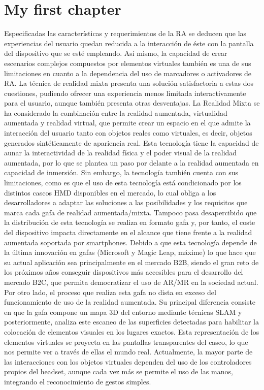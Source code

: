 \chapter{My first chapter}
Especificadas las características y requerimientos de la RA se deducen que las experiencias del usuario quedan reducida a la interacción de éste con la pantalla del dispositivo que se esté empleando. Así mismo, la capacidad de crear escenarios complejos compuestos por elementos virtuales también es una de sus limitaciones en cuanto a la dependencia del uso de marcadores o activadores de RA. La técnica de realidad mixta presenta una solución satisfactoria a estas dos cuestiones, pudiendo ofrecer una experiencia menos limitada interactivamente para el usuario, aunque también presenta otras desventajas.
La Realidad Mixta se ha considerado la combinación entre la realidad aumentada, virtualidad aumentada y realidad virtual, que permite crear un espacio en el que admite la interacción del usuario tanto con objetos reales como virtuales, es decir, objetos generados sintéticamente de apariencia real. Esta tecnología tiene la capacidad de aunar la interactividad de la realidad física y el poder visual de la realidad aumentada, por lo que se plantea un paso por delante a la realidad aumentada en capacidad de inmersión. Sin embargo, la tecnología también cuenta con sus limitaciones, como es que el uso de esta tecnología está condicionado por los distintos cascos HMD disponibles en el mercado, lo cual obliga a los desarrolladores a adaptar las soluciones a las posibilidades y los requisitos que marca cada gafa de realidad aumentada/mixta. Tampoco pasa desapercibido que la distribución de esta tecnología se realiza en formato gafa y, por tanto, el coste del dispositivo impacta directamente en el alcance que tiene frente a la realidad aumentada soportada por smartphones. Debido a que esta tecnología depende de la última innovación en gafas (Microsoft y Magic Leap, máxime) lo que hace que su actual aplicación sea principalmente en el mercado B2B, siendo el gran reto de los próximos años conseguir dispositivos más accesibles para el desarrollo del mercado B2C, que permita democratizar el uso de AR/MR en la sociedad actual.
Por otro lado, el proceso que realiza esta gafa no dista en exceso del funcionamiento de uso de la realidad aumentada. Su principal diferencia consiste en que la gafa compone un mapa 3D del entorno mediante técnicas SLAM y posteriormente, analiza este escaneo de las superficies detectadas para habilitar la colocación de elementos visuales en los lugares exactos. Esta representación de los elementos virtuales se proyecta en las pantallas transparentes del casco, lo que nos permite ver a través de ellas el mundo real. Actualmente, la mayor parte de las interacciones con los objetos virtuales dependen del uso de los controladores propios del headset, aunque cada vez más se permite el uso de las manos, integrando el reconocimiento de gestos simples.
